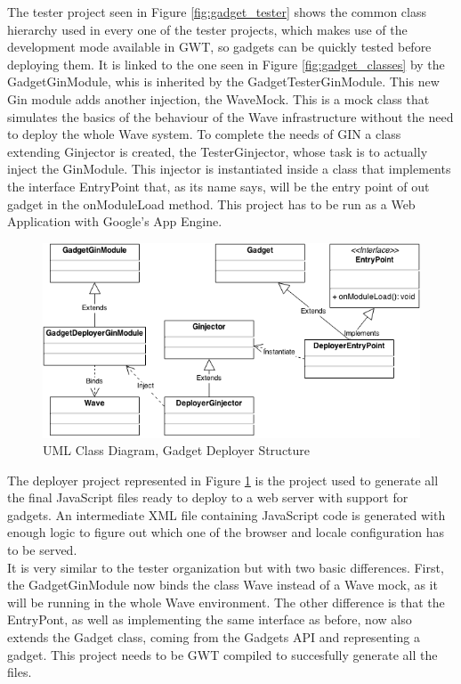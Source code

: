 The tester project seen in Figure \ref{fig:gadget_tester} shows the common class hierarchy used in every one of the tester projects, which makes use of the development mode available in GWT, so gadgets can be quickly tested before deploying them. It is linked to the one seen in Figure \ref{fig:gadget_classes} by the GadgetGinModule, whis is inherited by the GadgetTesterGinModule. This new Gin module adds another injection, the WaveMock. This is a mock class that simulates the basics of the behaviour of the Wave infrastructure without the need to deploy the whole Wave system. To complete the needs of GIN a class extending Ginjector is created, the TesterGinjector, whose task is to actually inject the GinModule. This injector is instantiated inside a class that implements the interface EntryPoint that, as its name says, will be the entry point of out gadget in the onModuleLoad method. This project has to be run as a Web Application with Google's App Engine.
\begin{figure}[H]
  \center
    \includegraphics[keepaspectratio, scale=0.5]{Media/Diagrams/Gadget/Deployer.png}
  \caption{UML Class Diagram, Gadget Deployer Structure}
  \label{fig:gadget_deployer}
\end{figure}
The deployer project represented in Figure \ref{fig:gadget_deployer} is the project used to generate all the final JavaScript files ready to deploy to a web server with support for gadgets. An intermediate XML file containing JavaScript code is generated with enough logic to figure out which one of the browser and locale configuration has to be served.\\[.2cm]
It is very similar to the tester organization but with two basic differences. First, the GadgetGinModule now binds the class Wave instead of a Wave mock, as it will be running in the whole Wave environment. The other difference is that the EntryPont, as well as implementing the same interface as before, now also extends the Gadget class, coming from the Gadgets API and representing a gadget. This project needs to be GWT compiled to succesfully generate all the files.\\[.2cm]
